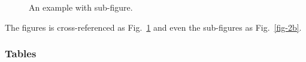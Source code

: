 \documentclass[
  journal,
]{IEEEtran}%
\begin{document}
\begin{figure}

\begin{minipage}{0.50\linewidth}


\subcaption{\label{fig-2a}}

\end{minipage}%
%
\begin{minipage}{0.50\linewidth}


\subcaption{\label{fig-2b}}

\end{minipage}%

\caption{\label{fig-2}An example with sub-figure.}

\end{figure}%

The figures is cross-referenced as Fig.~\ref{fig-2} and even the
sub-figures as Fig.~\ref{fig-2b}.

\subsubsection{Tables}\label{sec-tables}
\end{document}
